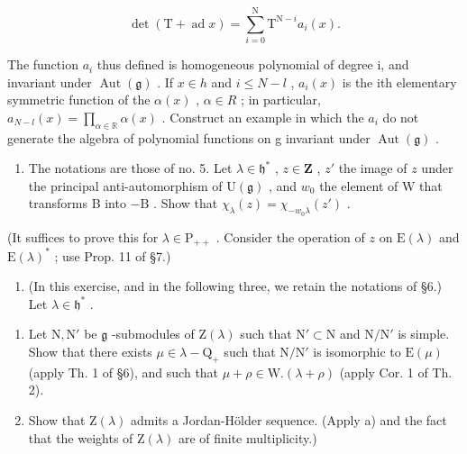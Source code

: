 \[
\det (\mathrm{T} + \operatorname{ad} x) = \sum_ {i = 0} ^ {\mathrm{N}} \mathrm{T} ^ {\mathrm{N} - i} a _ {i} (x).
\]

The function \(a_{i}\) thus defined is homogeneous polynomial of degree i, and invariant under \(\operatorname{Aut}(\mathfrak{g})\) . If \(x \in h\) and \(i \leq N - l\) , \(a_{i}(x)\) is the ith elementary symmetric function of the \(\alpha(x)\) , \(\alpha \in R\) ; in particular, \(a_{N-l}(x) = \prod_{\alpha \in \mathbb{R}} \alpha(x)\) . Construct an example in which the \(a_{i}\) do not generate the algebra of polynomial functions on g invariant under \(\operatorname{Aut}(\mathfrak{g})\) .

\begin{enumerate}
\def\labelenumi{\arabic{enumi})}
\setcounter{enumi}{8}
\tightlist
\item
  The notations are those of no. 5. Let \(\lambda \in \mathfrak{h}^*\) , \(z \in \mathbf{Z}\) , \(z'\) the image of \(z\) under the principal anti-automorphism of \(\mathrm{U}(\mathfrak{g})\) , and \(w_0\) the element of W that transforms B into \(-\mathrm{B}\) . Show that \(\chi_{\lambda}(z) = \chi_{-w_0\lambda}(z')\) .
\end{enumerate}

(It suffices to prove this for \(\lambda \in \mathrm{P}_{++}\) . Consider the operation of \(z\) on \(\mathrm{E}(\lambda)\) and \(\mathrm{E}(\lambda)^*\) ; use Prop. 11 of §7.)

\begin{enumerate}
\def\labelenumi{\arabic{enumi})}
\setcounter{enumi}{9}
\tightlist
\item
  (In this exercise, and in the following three, we retain the notations of §6.) Let \(\lambda \in \mathfrak{h}^*\) .
\end{enumerate}

\begin{enumerate}
\def\labelenumi{\alph{enumi})}
\tightlist
\item
  Let \(\mathrm{N}, \mathrm{N}'\) be \(\mathfrak{g}\) -submodules of \(\mathrm{Z}(\lambda)\) such that \(\mathrm{N}' \subset \mathrm{N}\) and \(\mathrm{N} / \mathrm{N}'\) is simple. Show that there exists \(\mu \in \lambda - \mathrm{Q}_+\) such that \(\mathrm{N} / \mathrm{N}'\) is isomorphic to \(\mathrm{E}(\mu)\) (apply Th. 1 of §6), and such that \(\mu + \rho \in \mathrm{W}.(\lambda + \rho)\) (apply Cor. 1 of Th. 2).
\item
  Show that \(\mathrm{Z}(\lambda)\) admits a Jordan-Hölder sequence. (Apply a) and the fact that the weights of \(\mathrm{Z}(\lambda)\) are of finite multiplicity.)
\end{enumerate}

